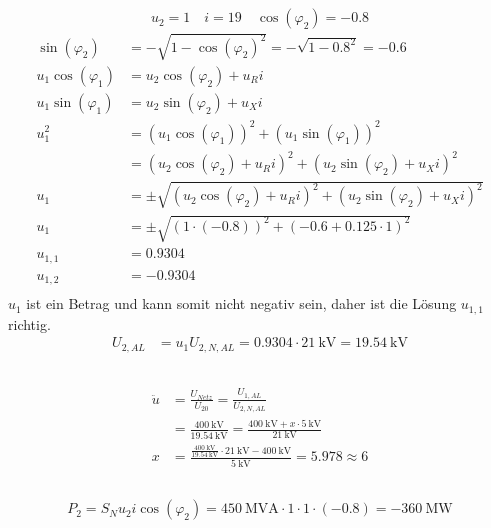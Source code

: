 \documentclass[11pt,a4paper]{scrartcl}
\newcommand{\mybr}[1]{\left(#1\right)}
\newcommand{\0}{_{\mybr{0}}}
\newcommand{\1}{_{\mybr{1}}}
\newcommand{\2}{_{\mybr{2}}}
\newcommand{\USA}{U_{2,AL}}
\newcommand{\USNA}{U_{2,N,AL}}
\newcommand{\ce}{\cos\mybr{\varphi_1}}
\newcommand{\se}{\sin\mybr{\varphi_1}}
\newcommand{\cz}{\cos\mybr{\varphi_2}}
\newcommand{\sz}{\sin\mybr{\varphi_2}}
\begin{document}
\subsection{}
\begin{equation}
u_2=1\quad i=\num{19}\quad \cz=-0.8
\end{equation}
\begin{align}
\sz&=-\sqrt{1-\cz^2}=-\sqrt{1-{\num{0.8}}^2}=\num{-0.6}\\
u_1\ce&=u_2\cz+u_R i\\
u_1\se&=u_2\sz+u_X i\\
u_1^2&=\mybr{u_1\ce}^2+\mybr{u_1\se}^2\\
&=\mybr{u_2\cz+u_R i}^2+\mybr{u_2\sz+u_X i}^2\\
u_1&=\pm\sqrt{\mybr{u_2\cz+u_R i}^2+\mybr{u_2\sz+u_X i}^2}\\
u_1&=\pm\sqrt{\mybr{1\cdot\mybr{\num{-0.8}}}^2+\mybr{\num{-0.6}+\num{0.125}\cdot 1}^2}\\
u_{1,1}&=\num{0.9304}\\
u_{1,2}&=\num{-0.9304}\\
\end{align}
$u_1$ ist ein Betrag und kann somit nicht negativ sein, daher ist die Lösung $u_{1,1}$ richtig.
\begin{align}
\USA&=u_1\USNA=\num{0.9304}\cdot\SI{21}{\kilo\volt}=\SI{19.54}{\kilo\volt}
\end{align}

\subsection{}
\begin{align}
\ddot{u}&=\frac{U_{Netz}}{U_{20}}=\frac{U_{1,AL}}{\USNA}\\
&=\frac{\SI{400}{\kilo\volt}}{\SI{19.54}{\kilo\volt}}=\frac{\SI{400}{\kilo\volt}+x\cdot\SI{5}{\kilo\volt}}{\SI{21}{\kilo\volt}}\\
x&=\frac{\frac{\SI{400}{\kilo\volt}}{\SI{19.54}{\kilo\volt}}\cdot\SI{21}{\kilo\volt}-\SI{400}{\kilo\volt}}{\SI{5}{\kilo\volt}}=5.978\approx 6
\end{align}

\subsection{}
\begin{equation}
P_2=S_N u_2 i \cz=\SI{450}{\mega\volt\ampere}\cdot\num{1}\cdot\num{1}\cdot\mybr{\num{-0.8}}=\SI{-360}{\mega\watt}
\end{equation}
\end{document}
